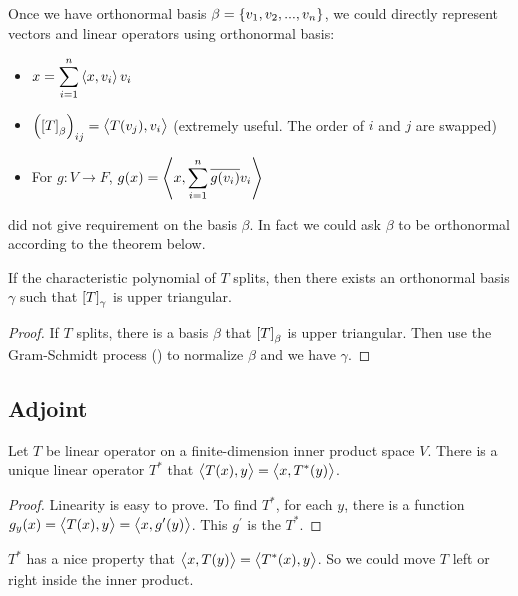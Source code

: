 Once we have orthonormal basis $\beta = \set{v_1, v_2, ..., v_n}$,  we could directly represent vectors and linear operators using orthonormal basis:
\begin{itemize}
    \item $\displaystyle x = \sum_{i=1}^n \left\langle \displaystyle x, v_i \right\rangle v_i$
    \item $\left(\coordinate{T}_\beta\right)_{ij} = \innerproduct{T(v_j)}{v_i}$ (extremely useful. The order of $i$ and $j$ are swapped)
    \item For $g: V \rightarrow F$, $g(x) = \left\langle \displaystyle x, \sum_{i=1}^n \overline{g(v_i)} v_i \right\rangle$
\end{itemize}



 did not give requirement on the basis $\beta$. In fact we could ask $\beta$ to be orthonormal according to the theorem below.

\begin{theorem}[Schur]\label{schur_theorem}
    If the characteristic polynomial of $T$ splits, then there exists an orthonormal basis $\gamma$ such that $\coordinate{T}_\gamma$ is upper triangular.
\end{theorem}
\begin{proof}
    If $T$ splits, there is a basis $\beta$ that $\coordinate{T}_\beta$ is upper triangular. Then use the Gram-Schmidt process () to normalize $\beta$ and we have $\gamma$.
\end{proof}



\subsection{Adjoint}


\begin{theorem}
    Let $T$ be linear operator on a finite-dimension inner product space $V$. There is a unique linear operator $T^*$ that $\left\langle \displaystyle T(x), y \right\rangle = \left\langle \displaystyle x, T^* (y) \right\rangle$.
\end{theorem}
\begin{proof}
    Linearity is easy to prove. To find $T^*$, for each $y$, there is a function $g_y (x) = \left\langle \displaystyle T(x), y \right\rangle = \left\langle \displaystyle x, g^\prime (y) \right\rangle$. This $g^\prime$ is the $T^*$.
\end{proof}

$T^*$ has a nice property that $\left\langle \displaystyle x, T(y) \right\rangle = \left\langle \displaystyle T^* (x), y \right\rangle$. So we could move $T$ left or right inside the inner product.

